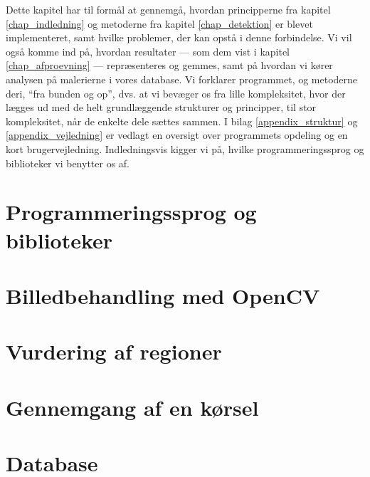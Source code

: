 {
{\sffamily Dette kapitel har til formål at gennemgå, hvordan
principperne fra kapitel \ref{chap_indledning} og metoderne fra kapitel
\ref{chap_detektion} er blevet implementeret, samt hvilke problemer, der
kan opstå i denne forbindelse. Vi vil også komme ind på, hvordan
resultater --- som dem vist i kapitel \ref{chap_afproevning} ---
repræsenteres og gemmes, samt på hvordan vi kører analysen på malerierne
i vores database.  Vi forklarer programmet, og metoderne deri, ``fra
bunden og op'', dvs. at vi bevæger os fra lille kompleksitet, hvor der
lægges ud med de helt grundlæggende strukturer og principper, til stor
kompleksitet, når de enkelte dele sættes sammen.  I bilag
\ref{appendix_struktur} og \ref{appendix_vejledning} er vedlagt en
oversigt over programmets opdeling og en kort brugervejledning.
Indledningsvis kigger vi på, hvilke programmeringssprog og biblioteker
vi benytter os af.
}

\section{Programmeringssprog og biblioteker\label{section_programmeringssprog}}


\section{Billedbehandling med OpenCV\label{section_impBilledbehandling}}


\section{Vurdering af regioner\label{section_vurdering_regioner}}


\section{Gennemgang af en kørsel\label{section_koersel}}


\section{Database\label{section_imp_database}}


}

